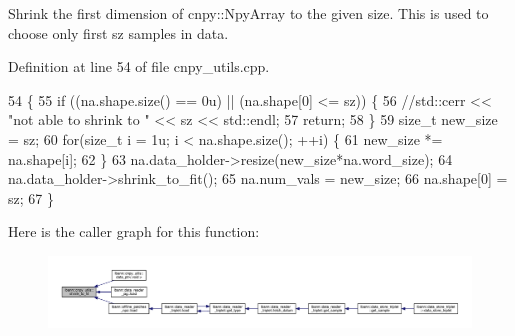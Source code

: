 Shrink the first dimension of cnpy\+::\+Npy\+Array to the given size. This is used to choose only first sz samples in data. 

Definition at line 54 of file cnpy\+\_\+utils.\+cpp.


\begin{DoxyCode}
54                                                 \{
55   \textcolor{keywordflow}{if} ((na.shape.size() == 0u) || (na.shape[0] <= sz)) \{
56     \textcolor{comment}{//std::cerr << "not able to shrink to " << sz << std::endl;}
57     \textcolor{keywordflow}{return};
58   \}
59   \textcolor{keywordtype}{size\_t} new\_size = sz;
60   \textcolor{keywordflow}{for}(\textcolor{keywordtype}{size\_t} i = 1u; i < na.shape.size(); ++i) \{
61     new\_size *= na.shape[i];
62   \}
63   na.data\_holder->resize(new\_size*na.word\_size);
64   na.data\_holder->shrink\_to\_fit();
65   na.num\_vals = new\_size;
66   na.shape[0] = sz;
67 \}
\end{DoxyCode}
Here is the caller graph for this function\+:\nopagebreak
\begin{figure}[H]
\begin{center}
\leavevmode
\includegraphics[width=350pt]{namespacelbann_1_1cnpy__utils_ab19ad0a361570b7e78e203c02d6ba13a_icgraph}
\end{center}
\end{figure}
